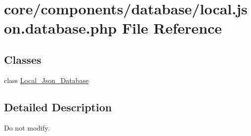 \hypertarget{local_8json_8database_8php}{}\section{core/components/database/local.json.\+database.\+php File Reference}
\label{local_8json_8database_8php}
\subsection*{Classes}
\begin{DoxyCompactItemize}
\item 
class \hyperlink{classLocal__Json__Database}{Local\+\_\+\+Json\+\_\+\+Database}
\end{DoxyCompactItemize}


\subsection{Detailed Description}
Do not modify. 
